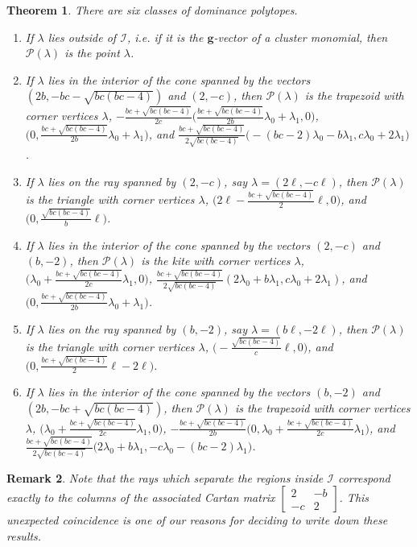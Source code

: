 \documentclass{amsart}
\newtheorem{theorem}{Theorem}
\newtheorem{remark}[theorem]{Remark}
\numberwithin{theorem}{section}
\newcommand{\bfg}{\boldsymbol{g}}
\newcommand{\cI}{\mathcal{I}}
\newcommand{\cP}{\mathcal{P}}
\begin{document}
  \begin{theorem}
    \label{th:dominance vertices}
    There are six classes of dominance polytopes.
    \begin{enumerate}
      \item If $\lambda$ lies outside of $\cI$, i.e. if it is the $\bfg$-vector of a cluster monomial, then $\cP(\lambda)$ is the point $\lambda$. 
      \item If $\lambda$ lies in the interior of the cone spanned by the vectors $(2b,-bc-\sqrt{bc(bc-4)})$ and $(2,-c)$, then $\cP(\lambda)$ is the trapezoid with corner vertices $\lambda$, $-\frac{bc+\sqrt{bc(bc-4)}}{2c}\big(\frac{bc+\sqrt{bc(bc-4)}}{2b}\lambda_0+\lambda_1,0\big)$, $\big(0,\frac{bc+\sqrt{bc(bc-4)}}{2b}\lambda_0+\lambda_1\big)$, and $\frac{bc+\sqrt{bc(bc-4)}}{2\sqrt{bc(bc-4)}}\big(-(bc-2)\lambda_0-b\lambda_1,c\lambda_0+2\lambda_1\big)$.
      \item If $\lambda$ lies on the ray spanned by $(2,-c)$, say $\lambda=(2\ell,-c\ell)$, then $\cP(\lambda)$ is the triangle with corner vertices $\lambda$, $\big(2\ell-\frac{bc+\sqrt{bc(bc-4)}}{2}\ell,0\big)$, and $\big(0,\frac{\sqrt{bc(bc-4)}}{b}\ell\big)$.
      \item If $\lambda$ lies in the interior of the cone spanned by the vectors $(2,-c)$ and $(b,-2)$, then $\cP(\lambda)$ is the kite with corner vertices $\lambda$, $\big(\lambda_0+\frac{bc+\sqrt{bc(bc-4)}}{2c}\lambda_1,0\big)$, $\frac{bc+\sqrt{bc(bc-4)}}{2\sqrt{bc(bc-4)}}(2\lambda_0+b\lambda_1,c\lambda_0+2\lambda_1)$, and $\big(0,\frac{bc+\sqrt{bc(bc-4)}}{2b}\lambda_0+\lambda_1\big)$.
      \item If $\lambda$ lies on the ray spanned by $(b,-2)$, say $\lambda=(b\ell,-2\ell)$, then $\cP(\lambda)$ is the triangle with corner vertices $\lambda$, $\big(-\frac{\sqrt{bc(bc-4)}}{c}\ell,0\big)$, and $\big(0,\frac{bc+\sqrt{bc(bc-4)}}{2}\ell-2\ell\big)$.
      \item If $\lambda$ lies in the interior of the cone spanned by the vectors $(b,-2)$ and $(2b,-bc+\sqrt{bc(bc-4)})$, then $\cP(\lambda)$ is the trapezoid with corner vertices $\lambda$, $\big(\lambda_0+\frac{bc+\sqrt{bc(bc-4)}}{2c}\lambda_1,0\big)$, $-\frac{bc+\sqrt{bc(bc-4)}}{2b}\big(0,\lambda_0+\frac{bc+\sqrt{bc(bc-4)}}{2c}\lambda_1\big)$, and $\frac{bc+\sqrt{bc(bc-4)}}{2\sqrt{bc(bc-4)}}\big(2\lambda_0+b\lambda_1,-c\lambda_0-(bc-2)\lambda_1\big)$.
    \end{enumerate}
  \end{theorem}

  \begin{remark}
    Note that the rays which separate the regions inside $\cI$ correspond exactly to the columns of the associated Cartan matrix $\left[ \begin{array}{cc} 2 & -b \\ -c & 2 \end{array} \right]$.
    This unexpected coincidence is one of our reasons for deciding to write down these results.
  \end{remark}
\end{document}
